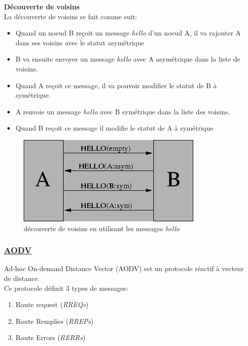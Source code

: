 \documentclass[a4paper, 12pt]{report}
\begin{document}
        \textbf{Découverte de voisins}\\
        La découverte de voisins se fait comme suit:
        \begin{itemize}
            \item Quand un noeud B reçoit un message \textit{hello} d'un noeud A,
                il va rajouter A dans ses voisins avec le statut asymétrique
            \item B va ensuite envoyer un message \textit{hello} avec A asymétrique dans la liste de voisins.
            \item Quand A reçoit ce message, il va pouvoir modifier le statut de B à symétrique.
            \item A renvoie un message \textit{hello} avec B symétrique dans la liste des voisins.
            \item Quand B reçoit ce message il modifie le statut de A à symétrique
        \end{itemize}
        \begin{figure}[H]
            \centering
            \includegraphics[scale=0.6]{images/olsr_neighborDiscovery.png}
            \caption{découverte de voisins en utilisant les messages \textit{hello} \cite{olsr_neighborDiscovery_w}}
            \label{olsr_neighborDiscovery}
        \end{figure}
    
    \subsubsection{\underline{AODV}}
        Ad-hoc On-demand Distance Vector (AODV) est un protocole réactif à vecteur de distance.\\
        Ce protocole définit 3 types de messages:
        \begin{enumerate}
            \item Route request (\textit{RREQs})
            \item Route Remplies (\textit{RREPs})
            \item Route Errors (\textit{RERRs})
        \end{enumerate}
\end{document}
